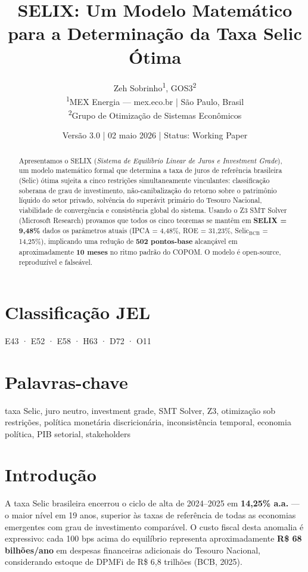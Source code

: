 \documentclass[12pt,a4paper]{article}
\title{SELIX: Um Modelo Matemático para a Determinação da Taxa Selic Ótima}
\author{Zeh Sobrinho\textsuperscript{1}, GOS3\textsuperscript{2} \\
\textsuperscript{1}MEX Energia — mex.eco.br | São Paulo, Brasil \\
\textsuperscript{2}Grupo de Otimização de Sistemas Econômicos}
\date{Versão 3.0 | 02 maio 2026 | Status: Working Paper}
\begin{document}
\maketitle

\begin{abstract}
\noindent Apresentamos o SELIX (\textit{Sistema de Equilíbrio Linear de Juros e Investment Grade}), um modelo matemático formal que determina a taxa de juros de referência brasileira (Selic) ótima sujeita a cinco restrições simultaneamente vinculantes: classificação soberana de grau de investimento, não-canibalização do retorno sobre o patrimônio líquido do setor privado, solvência do superávit primário do Tesouro Nacional, viabilidade de convergência e consistência global do sistema. Usando o Z3 SMT Solver (Microsoft Research) provamos que todos os cinco teoremas se mantêm em \textbf{SELIX = 9,48\%} dados os parâmetros atuais (IPCA = 4,48\%, ROE = 31,23\%, Selic$_{\text{BCB}}$ = 14,25\%), implicando uma redução de \textbf{502 pontos-base} alcançável em aproximadamente \textbf{10 meses} no ritmo padrão do COPOM. O modelo é open-source, reproduzível e falseável.
\end{abstract}

\section*{Classificação JEL}
E43 · E52 · E58 · H63 · D72 · O11

\section*{Palavras-chave}
taxa Selic, juro neutro, investment grade, SMT Solver, Z3, otimização sob restrições, política monetária discricionária, inconsistência temporal, economia política, PIB setorial, stakeholders

\section{Introdução}

A taxa Selic brasileira encerrou o ciclo de alta de 2024–2025 em \textbf{14,25\% a.a.} — o maior nível em 19 anos, superior às taxas de referência de todas as economias emergentes com grau de investimento comparável. O custo fiscal desta anomalia é expressivo: cada 100 bps acima do equilíbrio representa aproximadamente \textbf{R\$ 68 bilhões/ano} em despesas financeiras adicionais do Tesouro Nacional, considerando estoque de DPMFi de R\$ 6,8 trilhões (BCB, 2025).
\end{document}
